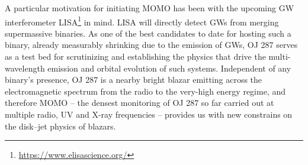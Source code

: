 \documentclass[preprints,article,accept,moreauthors,pdftex]{Definitions/mdpi}
\begin{document}
{A particular motivation for initiating MOMO has been with the upcoming GW interferometer LISA{\footnote{\url{https://www.elisascience.org/}}} in mind. LISA will directly detect GWs from merging supermassive binaries. As one of the best candidates to date for hosting such a binary, already measurably shrinking due to the emission of GWs, OJ 287 serves as a test bed for scrutinizing and establishing the physics that drive the multi-wavelength emission and orbital evolution of such systems. Independent of any binary's presence, OJ 287 is a nearby bright blazar emitting across the electromagnetic spectrum from the radio to the very-high energy regime, and therefore MOMO -- the densest monitoring of OJ 287 so far carried out at multiple radio, UV and X-ray frequencies -- provides us with new constrains on the disk--jet physics of blazars. 



\vspace{6pt} 






}
\end{document}
